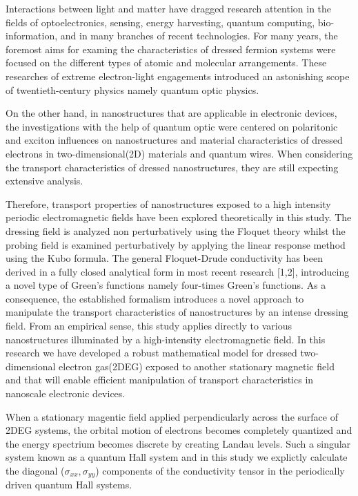 Interactions between light and matter have dragged research attention in the fields of optoelectronics, sensing, energy harvesting, quantum computing, bio-information, and in many branches of recent technologies. For many years, the foremost aims for examing the characteristics of dressed fermion systems were focused on the different types of atomic and molecular arrangements. These researches of extreme electron-light engagements introduced an astonishing scope of twentieth-century physics namely quantum optic physics.

On the other hand, in nanostructures that are applicable in electronic devices, the investigations with the help of quantum optic were centered on polaritonic and exciton influences on nanostructures and material characteristics of dressed electrons in two-dimensional(2D) materials and quantum wires. When considering the transport characteristics of dressed nanostructures, they are still expecting extensive analysis.

Therefore, transport properties of nanostructures exposed to a high intensity periodic electromagnetic fields have been explored theoretically in this study. The dressing field is analyzed non perturbatively using the Floquet theory whilst the probing field is examined perturbatively by applying the linear response method using the Kubo formula. The general Floquet-Drude conductivity has been derived in a fully closed analytical form in most recent research [1,2], introducing a novel type of Green’s functions namely four-times Green’s functions.
As a consequence, the established formalism introduces a novel approach to manipulate the transport characteristics of nanostructures by an intense dressing field. From an empirical sense, this study applies directly to various nanostructures illuminated by a high-intensity electromagnetic field.
In this research we have developed a robust mathematical model for dressed two-dimensional electron gas(2DEG) exposed to another stationary magnetic field and that will enable efficient manipulation of transport characteristics in nanoscale electronic devices.

When a stationary magentic field applied perpendicularly across the surface of 2DEG systems, the orbital motion of electrons becomes completely quantized and the energy spectrium becomes discrete by creating Landau levels. Such a singular system known as a quantum Hall system and in this study we explictly calculate the diagonal ($\sigma_{xx},\sigma_{yy}$) components of the conductivity tensor in the periodically driven quantum Hall systems.

